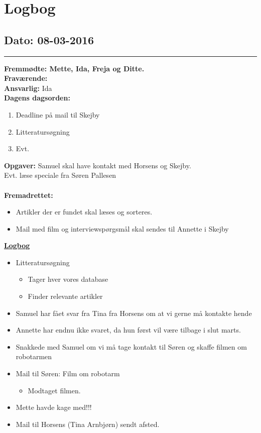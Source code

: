 \chapter{Logbog}
\section{Dato: 08-03-2016}
\hrule
\textbf{Fremmødte: Mette, Ida, Freja og Ditte.} \\
\textbf{Fraværende:} \\
\textbf{Ansvarlig:} Ida \\
\textbf{Dagens dagsorden: }
\begin{enumerate}
	\item Deadline på mail til Skejby 
	\item Litteratursøgning 
	\item Evt.
\end{enumerate}

\textbf{Opgaver:} \newline
Samuel skal have kontakt med Horsens og Skejby.\\
Evt. læse speciale fra Søren Pallesen\\
\\
\textbf{Fremadrettet: }
\begin{itemize}
\item Artikler der er fundet skal læses og sorteres.
\item Mail med film og interviewspørgsmål skal sendes til Annette i Skejby
\end{itemize}

\underline{\textbf{Logbog}}
\begin{itemize}
\item Litteratursøgning
\begin{itemize}
\item Tager hver vores database
\item Finder relevante artikler
\end{itemize}
\item Samuel har fået svar fra Tina fra Horsens om at vi gerne må kontakte hende
\item Annette har endnu ikke svaret, da hun først vil være tilbage i slut marts.
\item Snakkede med Samuel om vi må tage kontakt til Søren og skaffe filmen om robotarmen
\item Mail til Søren: Film om robotarm
\begin{itemize}
\item Modtaget filmen.
\end{itemize}
\item Mette havde kage med!!!
\item Mail til Horsens (Tina Arnbjørn) sendt afsted. 
\end{itemize}

\newpage